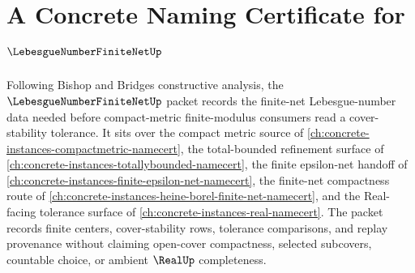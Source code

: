 \chapter{A Concrete Naming Certificate for $\LebesgueNumberFiniteNetUp$}
\label{ch:concrete-instances-lebesgue-number-finite-net-namecert}

Following Bishop and Bridges constructive analysis, the $\LebesgueNumberFiniteNetUp$ packet records the finite-net Lebesgue-number data needed before compact-metric finite-modulus consumers read a cover-stability tolerance. It sits over the compact metric source of \autoref{ch:concrete-instances-compactmetric-namecert}, the total-bounded refinement surface of \autoref{ch:concrete-instances-totallybounded-namecert}, the finite epsilon-net handoff of \autoref{ch:concrete-instances-finite-epsilon-net-namecert}, the finite-net compactness route of \autoref{ch:concrete-instances-heine-borel-finite-net-namecert}, and the Real-facing tolerance surface of \autoref{ch:concrete-instances-real-namecert}. The packet records finite centers, cover-stability rows, tolerance comparisons, and replay provenance without claiming open-cover compactness, selected subcovers, countable choice, or ambient $\RealUp$ completeness.

